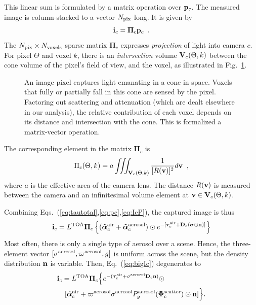 \documentclass[10pt,twocolumn,letterpaper]{article}
\newcommand{\vect}[1]{\bm{#1}}
\newcommand{\yoavcomment}[1]{}
\renewcommand{\yoavcomment}[1]{#1} %
\begin{document}
This linear sum is formulated by a matrix operation over ${\bf p}_c$. The measured image is column-stacked to a vector $N_{\rm pix}$ long. It is given by
\begin{equation}
 {\bf i}_c= {\vect{\Pi}}_c{\bf p}_c
  \;\;.
  \label{eq:IcP}
\end{equation}
The $N_{\rm pix}\times N_{\rm voxels}$ sparse matrix ${\vect{\Pi}}_c$ expresses {\em projection} of light into camera $c$. For pixel $\Theta$ and voxel $k$, there is an {\em intersection} volume ${\bf V}_c(\Theta,k)$ between the cone volume of the pixel's field of view, and the voxel, as illustrated in Fig.~\ref{fig:projection}.
\begin{figure}
  \centering
  \yoavcomment{\def\svgwidth{\columnwidth}}
  \caption{\small
  An image pixel captures light emanating in a cone in space. Voxels that fully or
  partially fall in this cone are sensed by the pixel. Factoring out
  scattering and attenuation (which are dealt elsewhere in our analysis), the
  relative contribution of each voxel depends on its distance and intersection with the cone. This is formalized a matrix-vector operation.}
  \label{fig:projection}
\end{figure}
The corresponding element in the matrix ${\vect{\Pi}}_c$ is
\begin{equation}
 \Pi_c(\Theta,k)=
     a
     \iiint_{{\bf V}_c(\Theta,k)}
     \frac{1}{[R({\bf v})]^2} d{\bf v}
  \;\;,
  \label{eq:Pc}
\end{equation}
where $a$ is the effective area of the camera lens.
The distance $R({\bf v})$ is measured between the camera and an infinitesimal volume element at ${\bf v}\in {\bf V}_c(\Theta,k)$.

Combining Eqs.~(\ref{eq:tautotal},\ref{eq:pc},\ref{eq:IcP}), the captured image is thus
\begin{align}
 {\bf i}_c= L^{\rm TOA}
    {\vect{\Pi}}_c
          \left\{
          (\tilde{\vect{\alpha}}^{\rm air}_c + \tilde{\vect{\alpha}}^{\rm aerosol}_c)
           \odot
            e^{-[\vect{\tau}_c^{\rm air}
               + {\bf D}_c (\vect{\sigma} \odot {\bf n})]}
           \right\}
  \label{eq:bigIc}
\end{align}
Most often, there is only a single type of aerosol over a scene. Hence, the three-element
vector $[{\sigma}^{\rm aerosol},\varpi^{\rm aerosol},g]$ is uniform across the scene, but the density distribution ${\bf n}$ is variable. Then, Eq.~(\ref{eq:bigIc}) degenerates to
\begin{align}
 {\bf i}_c= L^{\rm TOA}
    {\vect{\Pi}}_c
          \Big\{
            e^{-(\vect{\tau}_c^{\rm air}
                  + {\sigma}^{\rm aerosol} {\bf D}_c {\bf n})
              }\odot
  \;\;\;\;\;\;\;\;\;\;\;\;\;\;\;\;\;\;\;\;\;
     \nonumber \\
           [\tilde{\vect{\alpha}}^{\rm air}_c + %
           \varpi^{\rm aerosol}\sigma^{\rm aerosol}
           P^{\rm aerosol}_g(\vect{\Phi}^{\rm scatter}_c)
           \odot{\bf n}
           ]
           \Big\}
           .
  \label{eq:bigIA}
\end{align}
\end{document}
